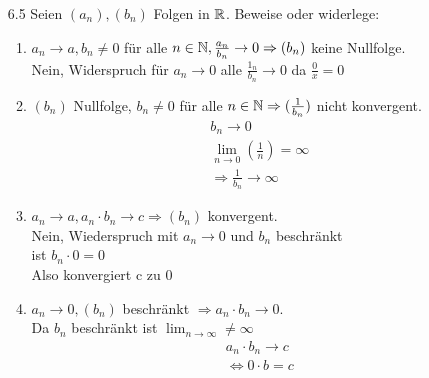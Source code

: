 \documentclass{HM}
\begin{document}
\begin{enumerate}
\begin{enumerate}
	\end{enumerate}
	\item[6.5] Seien $(a_n), (b_n)$ Folgen in $\mathbb{R}$. Beweise oder widerlege:
	\begin{enumerate}
		\item $a_n\to a, b_n\neq 0$ für alle $n\in\mathbb{N}, \frac{a_n}{b_n}\to 0 \Rightarrow (b_n)$ keine Nullfolge.\\
		Nein, Widerspruch für $a_n \to 0$ alle $\frac{1_n}{b_n}\to 0$ da $\frac{0}{x}=0$ 
		\item $(b_n)$ Nullfolge, $b_n\neq 0$ für alle $n\in\mathbb{N}\Rightarrow (\frac{1}{b_n})$ nicht konvergent.\\
		\begin{align*}
			b_n \to 0\\
			\lim_{n\to 0}\left(\frac{1}{n}\right)=\infty\\
			\Rightarrow \frac{1}{b_n} \to \infty
		\end{align*}
		\item $a_n\to a, a_n\cdot b_n \to c \Rightarrow (b_n)$ konvergent.\\
		Nein, Wiederspruch mit $a_n \to 0$ und $b_n$ beschränkt\\
		ist $b_n \cdot 0 = 0$\\
		Also konvergiert c zu $0$ 
		\item $a_n\to 0, (b_n)$ beschränkt $\Rightarrow a_n\cdot b_n \to 0$.\\
		Da $b_n$ beschränkt ist $\lim_{n\to \infty} \neq \infty$
		\begin{align*}
			a_n \cdot b_n \to c\\
			\Leftrightarrow 0 \cdot b = c
		\end{align*}
		

\end{enumerate}
\end{enumerate}
\end{document}
